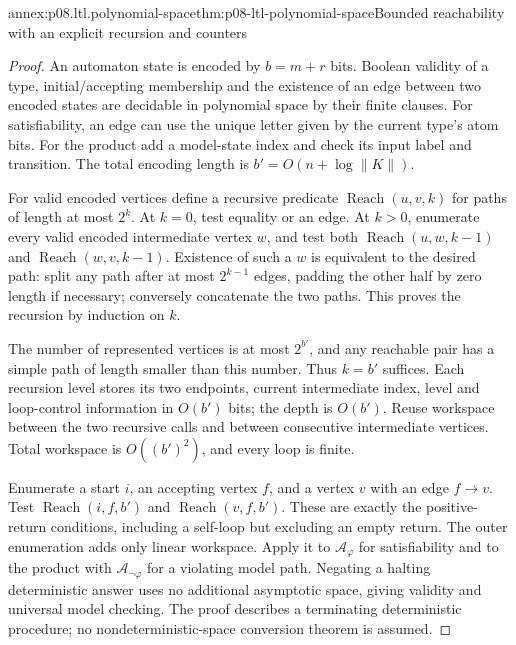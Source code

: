 \begin{annexitem}{annex:p08.ltl.polynomial-space}{thm:p08-ltl-polynomial-space}{Bounded reachability with an explicit recursion and counters}
\begin{proof}
An automaton state is encoded by \(b=m+r\) bits. Boolean
validity of a type, initial/accepting membership and the
existence of an edge between two encoded states are decidable
in polynomial space by their finite clauses. For satisfiability,
an edge can use the unique letter given by the current type's
atom bits. For the product add a model-state index and check
its input label and transition. The total encoding length is
\(b'=O(n+\log\lVert K\rVert)\).

For valid encoded vertices define a recursive predicate
\(\operatorname{Reach}(u,v,k)\) for paths of length at most
\(2^k\). At \(k=0\), test equality or an edge. At \(k>0\),
enumerate every valid encoded intermediate vertex \(w\),
and test both
\(\operatorname{Reach}(u,w,k-1)\) and
\(\operatorname{Reach}(w,v,k-1)\). Existence of such a
\(w\) is equivalent to the desired path: split any path
after at most \(2^{k-1}\) edges, padding the other half
by zero length if necessary; conversely concatenate the two
paths. This proves the recursion by induction on \(k\).

The number of represented vertices is at most \(2^{b'}\),
and any reachable pair has a simple path of length smaller
than this number. Thus \(k=b'\) suffices. Each recursion
level stores its two endpoints, current intermediate index,
level and loop-control information in \(O(b')\) bits;
the depth is \(O(b')\). Reuse workspace between the two
recursive calls and between consecutive intermediate vertices.
Total workspace is \(O((b')^2)\), and every loop is finite.

Enumerate a start \(i\), an accepting vertex \(f\), and a
vertex \(v\) with an edge \(f\to v\). Test
\(\operatorname{Reach}(i,f,b')\) and
\(\operatorname{Reach}(v,f,b')\). These are exactly the
positive-return conditions, including a self-loop but excluding
an empty return. The outer enumeration adds only linear
workspace. Apply it to \(\mathcal A_\varphi\) for
satisfiability and to the product with
\(\mathcal A_{\neg\varphi}\) for a violating model path.
Negating a halting deterministic answer uses no additional
asymptotic space, giving validity and universal model checking.
The proof describes a terminating deterministic procedure;
no nondeterministic-space conversion theorem is assumed.
\end{proof}
\end{annexitem}

